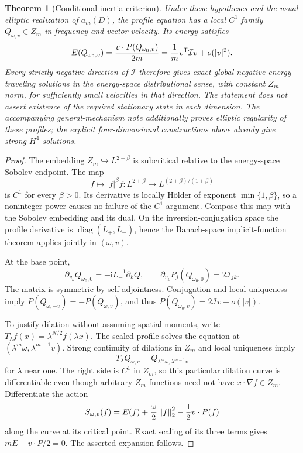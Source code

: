 \documentclass[11pt,a4paper]{article}
\newtheorem{theorem}{Theorem}[section]
\theoremstyle{remark}\newtheorem{remark}[theorem]{Remark}
\newcommand{\ii}{\mathrm i}\newcommand{\dd}{\,\mathrm d}
\newcommand{\norm}[1]{\left\|#1\right\|}
\begin{document}
\begin{theorem}[Conditional inertia criterion]\label{thm:inertia}
Under these hypotheses and the usual elliptic realization of $a_m(D)$, the profile equation has a local $C^1$ family $Q_{\omega,v}\in Z_m$ in frequency and vector velocity. Its energy satisfies
\[
 E(Q_{\omega_0,v})={v\cdot P(Q_{\omega_0,v})\over2m}
 ={1\over m}v^{\mathsf T}\mathcal I v+o(|v|^2).
\]
Every strictly negative direction of $\mathcal I$ therefore gives exact global negative-energy traveling solutions in the energy-space distributional sense, with constant $Z_m$ norm, for sufficiently small velocities in that direction. The statement does not assert existence of the required stationary state in each dimension. The accompanying general-mechanism note additionally proves elliptic regularity of these profiles; the explicit four-dimensional constructions above already give strong $H^4$ solutions.
\end{theorem}
\begin{proof}
The embedding $Z_m\hookrightarrow L^{2+\beta}$ is subcritical relative to the energy-space Sobolev endpoint. The map
\[
 f\longmapsto |f|^\beta f:
 L^{2+\beta}\longrightarrow L^{(2+\beta)/(1+\beta)}
\]
is $C^1$ for every $\beta>0$. Its derivative is locally H\"older of exponent $\min\{1,\beta\}$, so a noninteger power causes no failure of the $C^1$ argument. Compose this map with the Sobolev embedding and its dual. On the inversion-conjugation space the profile derivative is $\operatorname{diag}(L_+,L_-)$, hence the Banach-space implicit-function theorem applies jointly in $(\omega,v)$.

At the base point,
\[
 \partial_{v_k}Q_{\omega_0,0}=-\ii L_-^{-1}\partial_kQ,
 \qquad \partial_{v_k}P_j(Q_{\omega_0,0})=2\mathcal I_{jk}.
\]
The matrix is symmetric by self-adjointness. Conjugation and local uniqueness imply $P(Q_{\omega,-v})=-P(Q_{\omega,v})$, and thus
$P(Q_{\omega_0,v})=2\mathcal I v+o(|v|)$.

To justify dilation without assuming spatial moments, write $T_\lambda f(x)=\lambda^{N/2}f(\lambda x)$. The scaled profile solves the equation at $(\lambda^m\omega,\lambda^{m-1}v)$. Strong continuity of dilations in $Z_m$ and local uniqueness imply
\[
 T_\lambda Q_{\omega,v}=Q_{\lambda^m\omega,\lambda^{m-1}v}
\]
for $\lambda$ near one. The right side is $C^1$ in $Z_m$, so this particular dilation curve is differentiable even though arbitrary $Z_m$ functions need not have $x\cdot\nabla f\in Z_m$. Differentiate the action
\[
 S_{\omega,v}(f)=E(f)+{\omega\over2}\norm f_2^2-{1\over2}v\cdot P(f)
\]
along the curve at its critical point. Exact scaling of its three terms gives $mE-v\cdot P/2=0$. The asserted expansion follows.
\end{proof}
\end{document}
